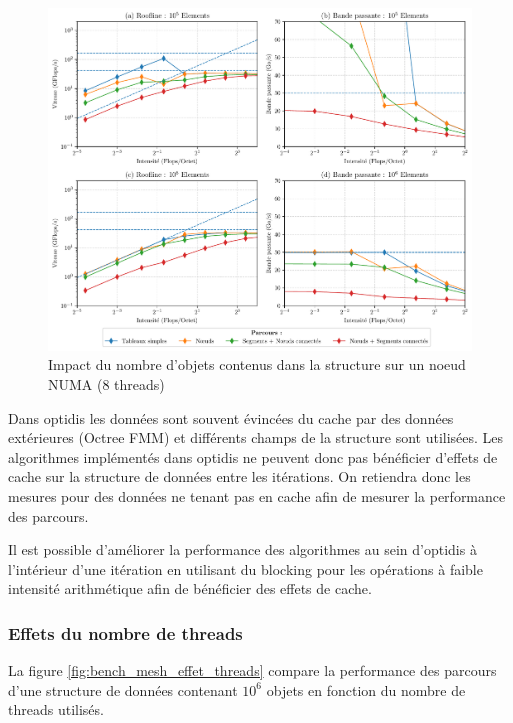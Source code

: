 \begin{figure}
    \centering
    \includegraphics[width=.8\textwidth]{img/bench_mesh_omp_effet_taille.pdf}
    \caption{Impact du nombre d'objets contenus dans la structure sur un noeud NUMA (8 threads)}
    \label{fig:bench_mesh_effet_taille}
\end{figure}

Dans optidis les données sont souvent évincées du cache par des données extérieures (Octree FMM) et différents champs de la structure sont utilisées. Les algorithmes implémentés dans optidis ne peuvent donc pas bénéficier d'effets de cache sur la structure de données entre les itérations. On retiendra donc les mesures pour des données ne tenant pas en cache afin de mesurer la performance des parcours.

Il est possible d'améliorer la performance des algorithmes au sein d'optidis à l'intérieur d'une itération en utilisant du blocking pour les opérations à faible intensité arithmétique afin de bénéficier des effets de cache. 

\subsubsection{Effets du nombre de threads}

La figure \ref{fig:bench_mesh_effet_threads} compare la performance des parcours d'une structure de données contenant $10^6$ objets en fonction du nombre de threads utilisés.

